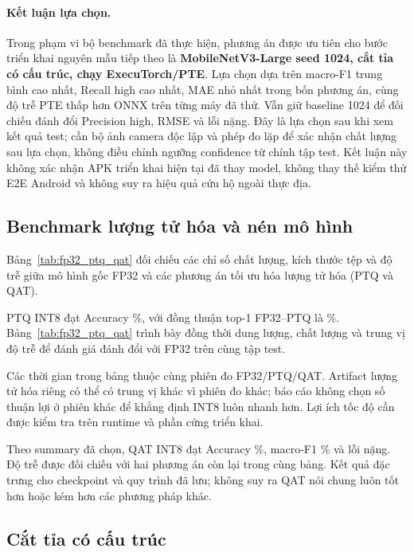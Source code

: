 \paragraph{Kết luận lựa chọn.}
Trong phạm vi bộ benchmark đã thực hiện, phương án được ưu tiên cho bước triển khai nguyên mẫu tiếp theo là \textbf{MobileNetV3-Large seed 1024, cắt tỉa có cấu trúc, chạy ExecuTorch/PTE}. Lựa chọn dựa trên macro-F1 trung bình cao nhất, Recall high cao nhất, MAE nhỏ nhất trong bốn phương án, cùng độ trễ PTE thấp hơn ONNX trên từng máy đã thử. Vẫn giữ baseline 1024 để đối chiếu đánh đổi Precision high, RMSE và lỗi nặng. Đây là lựa chọn sau khi xem kết quả test; cần bộ ảnh camera độc lập và phép đo lặp để xác nhận chất lượng sau lựa chọn, không điều chỉnh ngưỡng confidence từ chính tập test. Kết luận này không xác nhận APK triển khai hiện tại đã thay model, không thay thế kiểm thử E2E Android và không suy ra hiệu quả cứu hộ ngoài thực địa.

\subsection{Benchmark lượng tử hóa và nén mô hình}
Bảng~\ref{tab:fp32_ptq_qat} đối chiếu các chỉ số chất lượng, kích thước tệp và độ trễ giữa mô hình gốc FP32 và các phương án tối ưu hóa lượng tử hóa (PTQ và QAT).



PTQ INT8 đạt Accuracy \PTQAccuracy\%, với đồng thuận top-1 FP32--PTQ là \PTQAgreement\%. Bảng~\ref{tab:fp32_ptq_qat} trình bày đồng thời dung lượng, chất lượng và trung vị độ trễ để đánh giá đánh đổi với FP32 trên cùng tập test.

Các thời gian trong bảng thuộc cùng phiên đo FP32/PTQ/QAT. Artifact lượng tử hóa riêng có thể có trung vị khác vì phiên đo khác; báo cáo không chọn số thuận lợi ở phiên khác để khẳng định INT8 luôn nhanh hơn. Lợi ích tốc độ cần được kiểm tra trên runtime và phần cứng triển khai.

Theo summary đã chọn, QAT INT8 đạt Accuracy \QATAccuracy\%, macro-F1 \QATMacroFOne\% và \QATCriticalCount{} lỗi nặng. Độ trễ được đối chiếu với hai phương án còn lại trong cùng bảng. Kết quả đặc trưng cho checkpoint và quy trình đã lưu; không suy ra QAT nói chung luôn tốt hơn hoặc kém hơn các phương pháp khác.

\subsection{Cắt tỉa có cấu trúc}

